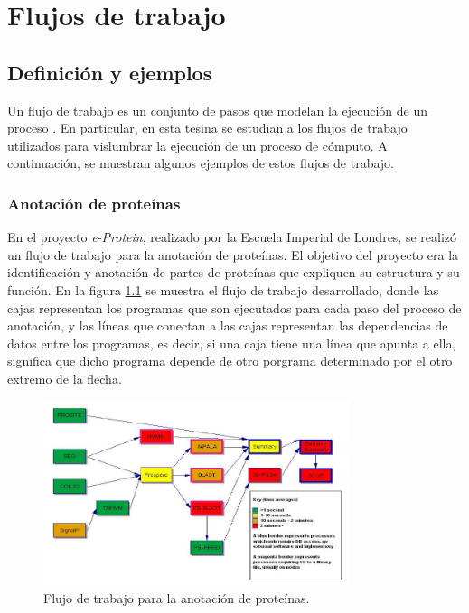\chapter{Flujos de trabajo}

\section{Definición y ejemplos}
Un flujo de trabajo es un conjunto de pasos que modelan la ejecución de un proceso \cite{gutierrez2012agent}.
En particular, en esta tesina se estudian a los flujos de trabajo utilizados para vislumbrar la ejecución de un proceso de cómputo. A continuación, se muestran algunos ejemplos de estos flujos de trabajo.

\subsection{Anotación de proteínas}
En el proyecto \emph{e-Protein}, realizado por la Escuela Imperial de Londres, se realizó un flujo de trabajo para la anotación de proteínas. El objetivo del proyecto \cite{o2004mapping} era la identificación y anotación de partes de proteínas que expliquen su estructura y su función. En la figura \ref{fig:iceni-workflow} se muestra el flujo de trabajo desarrollado, donde las cajas representan los programas que son ejecutados para cada paso del proceso de anotación, y las líneas que conectan a las cajas representan las dependencias de datos entre los programas, es decir, si una caja tiene una línea que apunta a ella, significa que dicho programa depende de otro porgrama determinado por el otro extremo de la flecha.

\begin{figure}
    \begin{center}
        \includegraphics[width=0.8\textwidth]{imagenes/iceni-workflow}
    \end{center}
    \caption{Flujo de trabajo para la anotación de proteínas.}
    \label{fig:iceni-workflow}
\end{figure}


